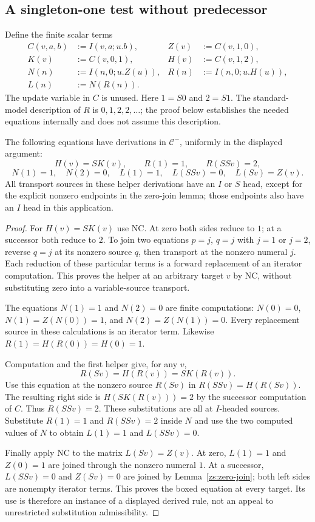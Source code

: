 \subsection{A singleton-one test without predecessor}

Define the finite scalar terms
\[
\begin{aligned}
 C(v,a,b)&:=I(v,a;u.b),& Z(v)&:=C(v,1,0),\\
 K(v)&:=C(v,0,1),& H(v)&:=C(v,1,2),\\
 N(n)&:=I(n,0;u.Z(u)),& R(n)&:=I(n,0;u.H(u)),\\
 L(n)&:=N(R(n)).
\end{aligned}
\tag{Tests}\label{zs:tests}
\]
The update variable in $C$ is unused. Here $1=S0$ and $2=S1$.
The standard-model description of $R$ is $0,1,2,2,\ldots$; the proof
below establishes the needed equations internally and does not assume
this description.

\begin{lemma}
\label{zs:singleton}
The following equations have derivations in $\mathcal C^{-}$,
uniformly in the displayed argument:
\[
 H(v)=S K(v),\qquad R(1)=1,\qquad R(SSv)=2,
\]
\[
 N(1)=1,\quad N(2)=0,\quad
 L(1)=1,\quad L(SSv)=0,\quad
 \boxed{L(Sv)=Z(v)}.
 \tag{Singleton}\label{zs:singleton-equations}
\]
All transport sources in these helper derivations have an $I$ or $S$
head, except for the explicit nonzero endpoints in the zero-join
lemma; those endpoints also have an $I$ head in this application.
\end{lemma}
\begin{proof}
For $H(v)=S K(v)$ use NC. At zero both sides reduce to $1$; at a
successor both reduce to $2$. To join two equations $p=j$, $q=j$
with $j=1$ or $j=2$, reverse $q=j$ at its nonzero source $q$, then
transport at the nonzero numeral $j$. Each reduction of these
particular terms is a forward replacement of an iterator computation.
This proves the helper at an arbitrary target $v$ by NC, without
substituting zero into a variable-source transport.

The equations $N(1)=1$ and $N(2)=0$ are finite computations:
$N(0)=0$, $N(1)=Z(N(0))=1$, and $N(2)=Z(N(1))=0$.
Every replacement source in these calculations is an iterator term.
Likewise $R(1)=H(R(0))=H(0)=1$.

Computation and the first helper give, for any $v$,
\[
 R(Sv)=H(R(v))=S K(R(v)).
\]
Use this equation at the nonzero source $R(Sv)$ in
$R(SSv)=H(R(Sv))$. The resulting right side is
$H(S K(R(v)))=2$ by the successor computation of $C$.
Thus $R(SSv)=2$. These substitutions are all at $I$-headed sources.
Substitute $R(1)=1$ and $R(SSv)=2$ inside $N$ and use the two
computed values of $N$ to obtain $L(1)=1$ and $L(SSv)=0$.

Finally apply NC to the matrix $L(Sv)=Z(v)$.
At zero, $L(1)=1$ and $Z(0)=1$ are joined through the nonzero numeral
$1$. At a successor, $L(SSv)=0$ and $Z(Sv)=0$ are joined by
Lemma~\ref{zs:zero-join}; both left sides are nonempty iterator terms.
This proves the boxed equation at every target. Its use is therefore
an instance of a displayed derived rule, not an appeal to unrestricted
substitution admissibility.
\end{proof}

